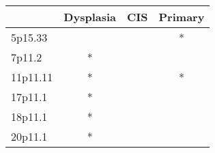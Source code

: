 \begin{tabular}{lccc}
\toprule
{} & Dysplasia & CIS & Primary \\
\midrule
5p15.33  &           &     &       * \\
7p11.2   &         * &     &         \\
11p11.11 &         * &     &       * \\
17p11.1  &         * &     &         \\
18p11.1  &         * &     &         \\
20p11.1  &         * &     &         \\
\bottomrule
\end{tabular}
